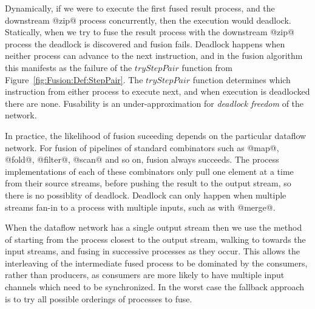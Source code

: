 Dynamically, if we were to execute the first fused result process, and the downstream @zip@ process concurrently, then the execution would deadlock. Statically, when we try to fuse the result process with the downstream @zip@ process the deadlock is discovered and fusion fails. Deadlock happens when neither process can advance to the next instruction, and in the fusion algorithm this manifests as the failure of the $tryStepPair$ function from Figure~\ref{fig:Fusion:Def:StepPair}. The $tryStepPair$ function determines which instruction from either process to execute next, and when execution is deadlocked there are none. Fusability is an under-approximation for \emph{deadlock freedom} of the network.




In practice, the likelihood of fusion suceeding depends on the particular dataflow network. For fusion of pipelines of standard combinators such as @map@, @fold@, @filter@, @scan@ and so on, fusion always succeeds. The process implementations of each of these combinators only pull one element at a time from their source streams, before pushing the result to the output stream, so there is no possiblity of deadlock. Deadlock can only happen when multiple streams fan-in to a process with multiple inputs, such as with @merge@. 

When the dataflow network has a single output stream then we use the method of starting from the process closest to the output stream, walking to towards the input streams, and fusing in successive processes as they occur. This allows the interleaving of the intermediate fused process to be dominated by the consumers, rather than producers, as consumers are more likely to have multiple input channels which need to be synchronized. In the worst case the fallback approach is to try all possible orderings of processes to fuse.

